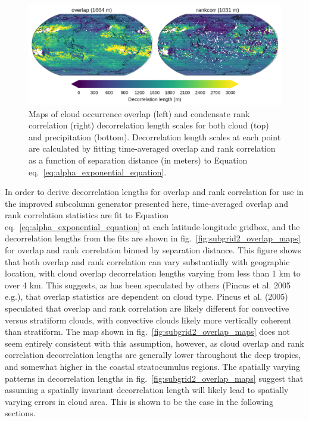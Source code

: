 \begin{figure}[htbp]
\centering
\includegraphics{graphics/subgrid2_overlap_maps.pdf}
\caption{\label{fig:subgrid2_overlap_maps}Maps of cloud occurrence
overlap (left) and condensate rank correlation (right) decorrelation
length scales for both cloud (top) and precipitation (bottom).
Decorrelation length scales at each point are calculated by fitting
time-averaged overlap and rank correlation as a function of separation
distance (in meters) to Equation
eq.~\ref{eq:alpha_exponential_equation}.}\label{fig:subgrid2ux5foverlapux5fmaps}
\end{figure}

In order to derive decorrelation lengths for overlap and rank
correlation for use in the improved subcolumn generator presented here,
time-averaged overlap and rank correlation statistics are fit to
Equation eq.~\ref{eq:alpha_exponential_equation} at each
latitude-longitude gridbox, and the decorrelation lengths from the fits
are shown in fig.~\ref{fig:subgrid2_overlap_maps} for overlap and rank
correlation binned by separation distance. This figure shows that both
overlap and rank correlation can vary substantially with geographic
location, with cloud overlap decorrelation lengths varying from less
than 1 km to over 4 km. This suggests, as has been speculated by others
(Pincus et al. 2005 e.g.), that overlap statistics are dependent on
cloud type. Pincus et al. (2005) speculated that overlap and rank
correlation are likely different for convective versus stratiform
clouds, with convective clouds likely more vertically coherent than
stratiform. The map shown in fig.~\ref{fig:subgrid2_overlap_maps} does
not seem entirely consistent with this assumption, however, as cloud
overlap and rank correlation decorrelation lengths are generally lower
throughout the deep tropics, and somewhat higher in the coastal
stratocumulus regions. The spatially varying patterns in decorrelation
lengths in fig.~\ref{fig:subgrid2_overlap_maps} suggest that assuming a
spatially invariant decorrelation length will likely lead to spatially
varying errors in cloud area. This is shown to be the case in the
following sections.

